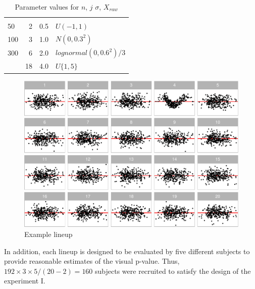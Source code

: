 \documentclass[]{interact}
\theoremstyle{plain}%
\theoremstyle{definition}
\theoremstyle{remark}
\begin{document}
\begin{table}

\caption{\label{tab:parameter-table}Parameter values for $n$, $j$ $\sigma$, $X_{raw}$}
\centering
\begin{tabular}[t]{lrrl}
\toprule
{} &  &  &  \\
\cmidrule(l{3pt}r{3pt}){1-1} \cmidrule(l{3pt}r{3pt}){2-2} \cmidrule(l{3pt}r{3pt}){3-3} \cmidrule(l{3pt}r{3pt}){4-4}
50 & 2 & 0.5 & $U(-1, 1)$\\
100 & 3 & 1.0 & $N(0, 0.3^2)$\\
300 & 6 & 2.0 & $lognormal(0, 0.6^2)/3$\\
 & 18 & 4.0 & $U\{1, 5\}$\\
\bottomrule
\end{tabular}
\end{table}

\begin{figure}
\centering
\includegraphics{paper_comparison_files/figure-latex/example-lineup-1.pdf}
\caption{Example lineup \label{fig:example-lineup}}
\end{figure}

In addition, each lineup is designed to be evaluated by five different
subjects to provide reasonable estimates of the visual p-value. Thus,
\(192 \times 3 \times 5 / (20 - 2) = 160\) subjects were recruited to
satisfy the design of the experiment I.
\end{document}
